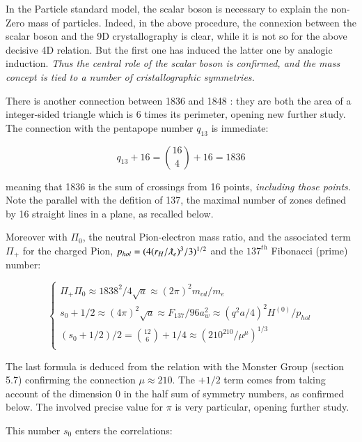 \documentclass[a4paper,9pt]{article}
\begin{document}
In the Particle standard  model, the scalar boson is necessary to explain the non-Zero mass of particles. Indeed, in the above procedure, the connexion between the scalar boson and the 9D crystallography is clear, while it is not so for the above decisive 4D relation. But the first one has induced the latter one by analogic induction. \textit{Thus the central role of the scalar boson is confirmed, and the mass concept is tied to a number of cristallographic symmetries.} 

There is another connection between 1836 and 1848 : they are both the area of a integer-sided triangle which is 6 times its perimeter, opening new further study. The connection with the pentapope number $q_{13}$ is immediate:

\begin{equation}\label{Eq29}
 q_{13}+16 = \binom{16}{4} + 16 = 1836
 \end{equation}
 
meaning that 1836 is the sum of crossings from 16 points, \textit {including those points}. Note the parallel with the defition of 137, the maximal number of zones defined by 16 straight lines in a plane, as recalled below.

Moreover with $\Pi_0$, the neutral Pion-electron mass ratio, and the associated term $\Pi_+$ for the charged Pion, $ p_{hol} = (4 (r_H/\lambdabar_e)^3/3)^{1/2}$ and the $137^{th}$ Fibonacci (prime) number:

 \begin{equation}\label{Eq30}
 \left\{
    \begin{array}{ll}
         \Pi_+ \Pi_0 \approx  1838^2/4\sqrt a \approx (2\pi)^2 m_{cd}/m_e \\
        s_0 + 1/2 \approx (4\pi)^2 \sqrt a \approx F_{137}/96 a_w^2 \approx (q^2a/4)^2 H^{(0)}/p_{hol} \\
          (s_0 +1/2)/2 = \binom{12}{6} + 1/4 \approx(210^{210}/\mu^{\mu})^{1/3} \\
    \end{array}
\right.
\end{equation}

The last formula is deduced from the relation with the Monster Group (section 5.7) confirming the connection $\mu \approx 210$. The $+1/2$ term comes from taking account of the dimension $0$ in the half sum of symmetry numbers, as confirmed below. The involved precise value for $\pi$ is very particular, opening further study.

This number $s_0$ enters the correlations:
\end{document}
